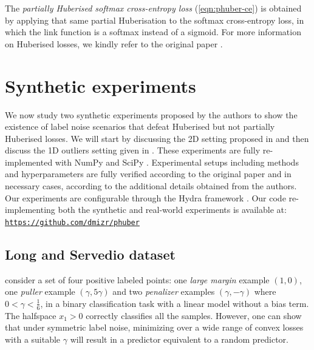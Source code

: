 The \emph{partially Huberised softmax cross-entropy loss} (\autoref{eqn:phuber-ce}) is obtained by applying that same partial Huberisation to the softmax cross-entropy loss, in which the link function is a softmax instead of a sigmoid. For more information on Huberised losses, we kindly refer to the original paper \parencite{menon_can_2019}.

\section{Synthetic experiments}
\label{sec:synthetic}

We now study two synthetic experiments proposed by the authors to show the existence of label noise scenarios that defeat Huberised but not partially Huberised losses. We will start by discussing the 2D setting proposed in \textcite{long_random_2010} and then discuss the 1D outliers setting given in \textcite{ding_statistical_2013}. These experiments are fully re-implemented with NumPy \parencite{harris_array_2020} and SciPy \parencite{virtanen_scipy_2020}. Experimental setups including methods and hyperparameters are fully verified according to the original paper and in necessary cases, according to the additional details obtained from the authors. Our experiments are configurable through the Hydra framework \parencite{yadan_hydra_2019}. Our code re-implementing both the synthetic and real-world experiments is available at: \texttt{\url{https://github.com/dmizr/phuber}}

\subsection{Long and Servedio dataset}
\label{sec:long&servedio}

\textcite{long_random_2010} consider a set of four positive labeled points: one \textit{large margin} example $(1,0)$, one \textit{puller} example $(\gamma, 5\gamma)$ and two \textit{penalizer} examples $(\gamma, -\gamma)$ where $0 < \gamma < \frac{1}{6}$, in a binary classification task with a linear model without a bias term.
The halfspace $x_1 > 0$ correctly classifies all the samples.
However, one can show that under symmetric label noise, minimizing over a wide range of convex losses with a suitable $\gamma$ will result in a predictor equivalent to a random predictor.

